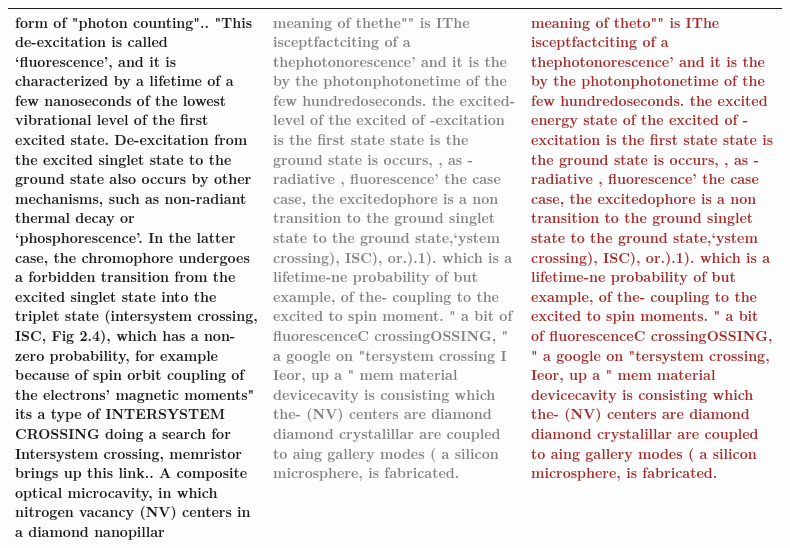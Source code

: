 \begin{table}[ht]
\begin{tabular}{p{0.3\linewidth}|p{0.3\linewidth}|p{0.3\linewidth}}
\\  
\hline  
  form of "photon counting"..  "This de-excitation is called ‘fluorescence’, and it is characterized by a lifetime of a few nanoseconds of the lowest vibrational level of the first excited state. De-excitation from the excited singlet state to the ground state also occurs by other mechanisms, such as non-radiant thermal decay or ‘phosphorescence’. In the latter case, the chromophore undergoes a forbidden transition from the excited singlet state into the triplet state (intersystem crossing, ISC, Fig 2.4), which has a non-zero probability, for example because of spin orbit coupling of the electrons’ magnetic moments"  its a type of INTERSYSTEM CROSSING  doing a search for Intersystem crossing, memristor brings up this link..  A composite optical microcavity, in which nitrogen vacancy (NV) centers in a diamond nanopillar  &
 \textcolor{gray}{meaning of thethe"" is  IThe isceptfactciting of a thephotonorescence’ and it is the by the photonphotonetime of the few hundredoseconds. the excited- level of the excited   of  -excitation is the first state state is the ground state is occurs,  ,  as -radiative  , fluorescence’  the case case, the excitedophore is a non transition to the ground singlet state to the ground state,‘ystem crossing), ISC), or.).1). which is a lifetime-ne probability of but example, of the- coupling to the excited to spin moment.  " a bit of fluorescenceC crossingOSSING, " a google on "tersystem crossing I Ieor, up a    " mem material devicecavity is consisting which the- (NV) centers are diamond diamond crystalillar are coupled to aing gallery modes ( a silicon microsphere, is fabricated.} &
 
\textcolor{brown}{meaning of theto"" is  IThe isceptfactciting of a thephotonorescence’ and it is the by the photonphotonetime of the few hundredoseconds. the excited energy state of the excited   of  -excitation is the first state state is the ground state is occurs,  ,  as -radiative  , fluorescence’  the case case, the excitedophore is a non transition to the ground singlet state to the ground state,‘ystem crossing), ISC), or.).1). which is a lifetime-ne probability of but example, of the- coupling to the excited to spin moments.  " a bit of fluorescenceC crossingOSSING, " a google on "tersystem crossing, Ieor, up a    " mem material devicecavity is consisting which the- (NV) centers are diamond diamond crystalillar are coupled to aing gallery modes ( a silicon microsphere, is fabricated.}
\\  
\hline  

\end{tabular}  
\label{tab:simul_seq_examples}  
\end{table} 
